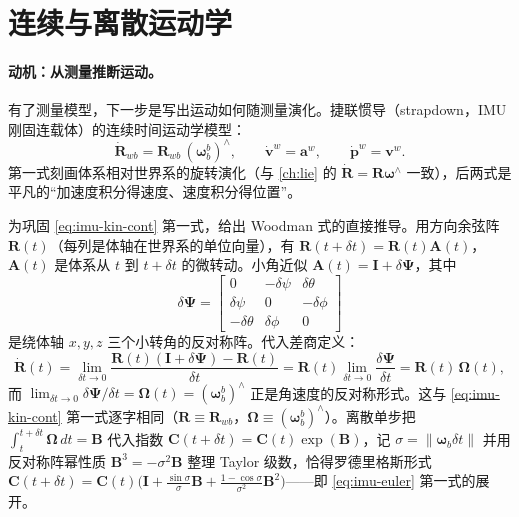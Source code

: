 \section{连续与离散运动学}
\label{sec:imu-kinematics}

\paragraph{动机：从测量推断运动。}
有了测量模型，下一步是写出运动如何随测量演化。捷联惯导（strapdown，IMU 刚固连载体）的连续时间运动学模型\cite{forster2017preintegration,woodman2007inertial}：
\begin{equation}
  \dot{\mathbf R}_{wb}=\mathbf R_{wb}\,(\boldsymbol\omega_b^b)^\wedge,\qquad
  \dot{\mathbf v}^w=\mathbf a^w,\qquad
  \dot{\mathbf p}^w=\mathbf v^w.
  \label{eq:imu-kin-cont}
\end{equation}
第一式刻画体系相对世界系的旋转演化（与 \cref{ch:lie} 的 $\dot{\mathbf R}=\mathbf R\boldsymbol\omega^\wedge$ 一致），后两式是平凡的“加速度积分得速度、速度积分得位置”。

\begin{derivation}[姿态微分方程的捷联推导]
为巩固 \cref{eq:imu-kin-cont} 第一式，给出 Woodman 式的直接推导\cite{woodman2007inertial}。用方向余弦阵 $\mathbf R(t)$（每列是体轴在世界系的单位向量），有 $\mathbf R(t+\delta t)=\mathbf R(t)\mathbf A(t)$，$\mathbf A(t)$ 是体系从 $t$ 到 $t+\delta t$ 的微转动。小角近似 $\mathbf A(t)=\mathbf I+\delta\boldsymbol\Psi$，其中
\[
  \delta\boldsymbol\Psi=\begin{bmatrix}0&-\delta\psi&\delta\theta\\\delta\psi&0&-\delta\phi\\-\delta\theta&\delta\phi&0\end{bmatrix}
\]
是绕体轴 $x,y,z$ 三个小转角的反对称阵。代入差商定义：
\[
  \dot{\mathbf R}(t)=\lim_{\delta t\to0}\frac{\mathbf R(t)(\mathbf I+\delta\boldsymbol\Psi)-\mathbf R(t)}{\delta t}
  =\mathbf R(t)\lim_{\delta t\to0}\frac{\delta\boldsymbol\Psi}{\delta t}=\mathbf R(t)\,\boldsymbol\Omega(t),
\]
而 $\lim_{\delta t\to0}\delta\boldsymbol\Psi/\delta t=\boldsymbol\Omega(t)=(\boldsymbol\omega_b^b)^\wedge$ 正是角速度的反对称形式。这与 \cref{eq:imu-kin-cont} 第一式逐字相同（$\mathbf R\equiv\mathbf R_{wb}$，$\boldsymbol\Omega\equiv(\boldsymbol\omega_b^b)^\wedge$）。离散单步把 $\int_t^{t+\delta t}\boldsymbol\Omega\,dt=\mathbf B$ 代入指数 $\mathbf C(t{+}\delta t)=\mathbf C(t)\exp(\mathbf B)$，记 $\sigma=\|\boldsymbol\omega_b\delta t\|$ 并用反对称阵幂性质 $\mathbf B^3=-\sigma^2\mathbf B$ 整理 Taylor 级数，恰得罗德里格斯形式 $\mathbf C(t{+}\delta t)=\mathbf C(t)\big(\mathbf I+\tfrac{\sin\sigma}{\sigma}\mathbf B+\tfrac{1-\cos\sigma}{\sigma^2}\mathbf B^2\big)$——即 \cref{eq:imu-euler} 第一式的展开。
\end{derivation}

